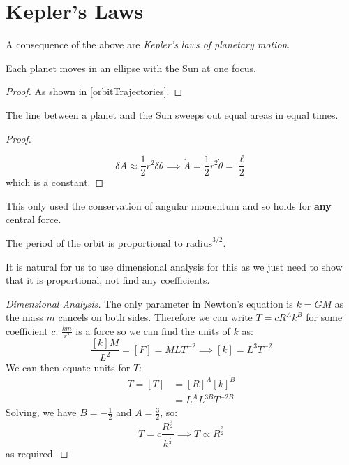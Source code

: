 \documentclass[../main.tex]{subfiles}
\begin{document}
\section{Kepler's Laws}
A consequence of the above are \textit{Kepler's laws of planetary motion}.
\begin{law}
  Each planet moves in an ellipse with the Sun at one focus.
\end{law}
\begin{proof}
  As shown in \cref{orbitTrajectories}.
\end{proof}
\begin{law}
  The line between a planet and the Sun sweeps out equal areas in equal times.
\end{law}
\begin{proof}
  \begin{center}
  \end{center}
  \[
    \delta A \approx \frac{1}{2}r^2 \delta \theta \implies \dot{A} = \frac{1}{2}r^2 \dot{\theta} = \frac{\ell}{2}
  \]
  which is a constant.
\end{proof}
\begin{remark}
  This only used the conservation of angular momentum and so holds for \textbf{any} central force.
\end{remark}
\begin{law}
  The period of the orbit is proportional to $\text{radius}^{3/2}$.
\end{law}
It is natural for us to use dimensional analysis for this as we just need to show that it is proportional, not find any coefficients.
\begin{proof}[Dimensional Analysis]
  The only parameter in Newton's equation is $k = GM$ as the mass $m$ cancels on both sides.
  Therefore we can write $T = cR^{A}k^{B}$ for some coefficient $c$.
  $\frac{km}{r^2}$ is a force so we can find the units of $k$ as:
  \[
    \frac{[k]M}{L^2} = [F] = MLT^{-2} \implies [k] = L^3T^{-2}
  \]
  We can then equate units for $T$:
  \begin{align*}
    T = [T] &= [R]^{A}[k]^{B} \\
            &= L^{A}L^{3B}T^{-2B}
  \end{align*}
  Solving, we have $B = -\frac{1}{2}$ and $A = \frac{3}{2}$, so:
  \[
    T = c \frac{R^{\frac{3}{2}}}{k^{\frac{1}{2}}} \implies T \propto R^{\frac{3}{2}}
  \]
  as required.
\end{proof}
\end{document}

